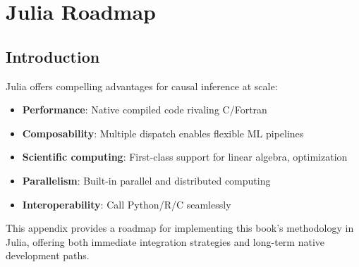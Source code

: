 
\appendix
\chapter{Julia Roadmap}
\label{app:julia}

\section{Introduction}\label{sec:app_julia_intro}

Julia offers compelling advantages for causal inference at scale:

\begin{itemize}
    \item \textbf{Performance}: Native compiled code rivaling C/Fortran
    \item \textbf{Composability}: Multiple dispatch enables flexible ML pipelines
    \item \textbf{Scientific computing}: First-class support for linear algebra, optimization
    \item \textbf{Parallelism}: Built-in parallel and distributed computing
    \item \textbf{Interoperability}: Call Python/R/C seamlessly
\end{itemize}

This appendix provides a roadmap for implementing this book's methodology in Julia, offering both immediate integration strategies and long-term native development paths.


